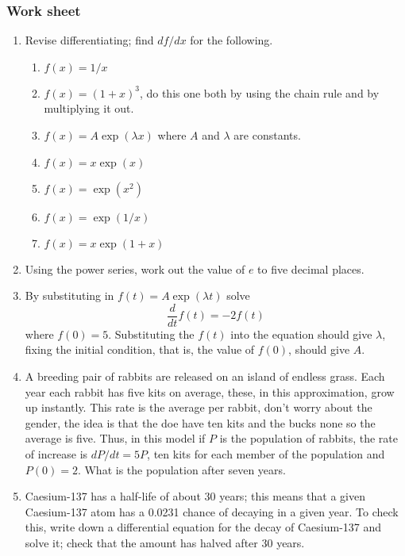 \documentclass[12pt]{article}
\begin{document}
\subsubsection*{Work sheet}

\begin{enumerate}

\item Revise differentiating; find $df/dx$ for the following.
\begin{enumerate}
\item $f(x)=1/x$
\item $f(x)=(1+x)^3$, do this one both by using the chain rule and by multiplying it out.
\item $f(x)=A\exp(\lambda x)$ where $A$ and $\lambda$ are constants.
\item $f(x)=x\exp(x)$
\item $f(x)=\exp(x^2)$
\item $f(x)=\exp(1/x)$
\item $f(x)=x\exp(1+x)$
\end{enumerate}

\item Using the power series, work out the value of $e$ to five decimal places.

\item By substituting in $f(t)=A\exp(\lambda t)$ solve 
\begin{equation}
\frac{d}{dt}f(t)=-2f(t)
\end{equation}
where $f(0)=5$. Substituting the $f(t)$ into the equation should give $\lambda$, fixing the initial condition, that is, the value of $f(0)$, should give $A$.

\item A breeding pair of rabbits are released on an island of endless
  grass. Each year each rabbit has five kits on average, these, in this
  approximation, grow up instantly. This rate is the average per rabbit,
  don't worry about the gender, the idea is that the doe have ten
  kits and the bucks none so the average is five. Thus, in this model
  if $P$ is the population of rabbits, the rate of increase is
  $dP/dt=5P$, ten kits for each member of the population and
  $P(0)=2$. What is the population after seven years.

\item Caesium-137 has a half-life of about 30 years; this means that a
  given Caesium-137 atom has a 0.0231 chance of decaying in a given
  year. To check this, write down a differential equation for the
  decay of Caesium-137 and solve it; check that the amount has halved
  after 30 years.


\end{enumerate}
\end{document}
